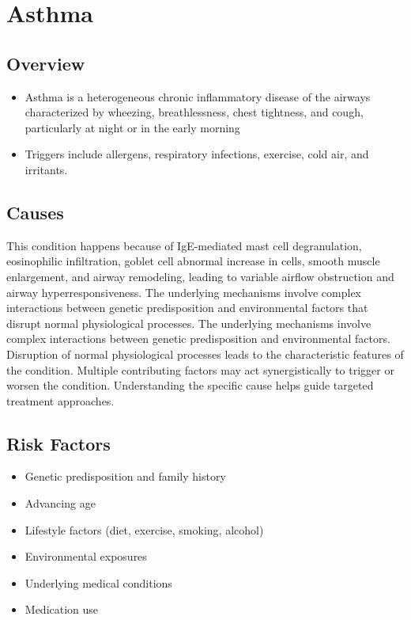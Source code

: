 \chapter{Asthma}
\label{sec:Asthma}

\section{Overview}


\begin{itemize}[noitemsep]
  \item Asthma is a heterogeneous chronic inflammatory disease of the airways characterized by wheezing, breathlessness, chest tightness, and cough, particularly at night or in the early morning
  \item Triggers include allergens, respiratory infections, exercise, cold air, and irritants.
\end{itemize}
\section{Causes}
This condition happens because of IgE-mediated mast cell degranulation, eosinophilic infiltration, goblet cell abnormal increase in cells, smooth muscle enlargement, and airway remodeling, leading to variable airflow obstruction and airway hyperresponsiveness. The underlying mechanisms involve complex interactions between genetic predisposition and environmental factors that disrupt normal physiological processes. The underlying mechanisms involve complex interactions between genetic predisposition and environmental factors. Disruption of normal physiological processes leads to the characteristic features of the condition. Multiple contributing factors may act synergistically to trigger or worsen the condition. Understanding the specific cause helps guide targeted treatment approaches.
\section{Risk Factors}


\begin{itemize}[noitemsep]
  \item Genetic predisposition and family history
  \item Advancing age
  \item Lifestyle factors (diet, exercise, smoking, alcohol)
  \item Environmental exposures
  \item Underlying medical conditions
  \item Medication use
\end{itemize}
